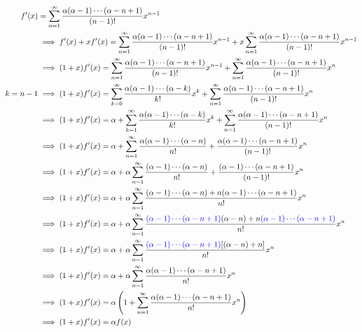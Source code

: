 \documentclass{article}
\begin{document}
\begin{align*}
  f'(x) &= \sum_{n=1}^\infty \frac{\alpha(\alpha
  -1)\cdots(\alpha-n+1)}{(n-1)!} x^{n-1}\\
  &\implies f'(x) + xf'(x) = \sum_{n=1}^\infty \frac{\alpha(\alpha
  -1)\cdots(\alpha-n+1)}{(n-1)!} x^{n-1} + x\sum_{n=1}^\infty \frac{\alpha(\alpha
    -1)\cdots(\alpha-n+1)}{(n-1)!} x^{n-1}\\
  &\implies (1+x)f'(x) = \sum_{n=1}^\infty \frac{\alpha(\alpha
  -1)\cdots(\alpha-n+1)}{(n-1)!} x^{n-1} + \sum_{n=1}^\infty \frac{\alpha(\alpha
    -1)\cdots(\alpha-n+1)}{(n-1)!} x^{n}\\
  k = n-1 &\implies (1+x)f'(x) = \sum_{k=0}^\infty \frac{\alpha(\alpha
            -1)\cdots(\alpha-k)}{k!} x^{k} + \sum_{n=1}^\infty \frac{\alpha(\alpha
            -1)\cdots(\alpha-n+1)}{(n-1)!} x^{n}\\
          &\implies (1+x)f'(x) = \alpha + \sum_{k=1}^\infty \frac{\alpha(\alpha
            -1)\cdots(\alpha-k)}{k!} x^{k} + \sum_{n=1}^\infty \frac{\alpha(\alpha
            -1)\cdots(\alpha-n+1)}{(n-1)!} x^{n}\\
  &\implies (1+x)f'(x) = \alpha + \sum_{n=1}^\infty \frac{\alpha(\alpha
            -1)\cdots(\alpha-n)}{n!} + \frac{\alpha(\alpha
    -1)\cdots(\alpha-n+1)}{(n-1)!} x^{n}\\
  &\implies (1+x)f'(x) = \alpha +\alpha \sum_{n=1}^\infty \frac{(\alpha
            -1)\cdots(\alpha-n)}{n!} + \frac{(\alpha
    -1)\cdots(\alpha-n+1)}{(n-1)!} x^{n}\\
  &\implies (1+x)f'(x) = \alpha +\alpha \sum_{n=1}^\infty \frac{(\alpha
            -1)\cdots(\alpha-n) + n(\alpha
    -1)\cdots(\alpha-n+1)}{n!} x^{n}\\
  &\implies (1+x)f'(x) = \alpha +\alpha \sum_{n=1}^\infty \frac{\color{blue}(\alpha
            -1)\cdots(\alpha -n+1)\color{black}(\alpha-n) + n\color{blue}(\alpha
    -1)\cdots(\alpha-n+1)\color{black}}{n!} x^{n}\\
  &\implies (1+x)f'(x) = \alpha +\alpha \sum_{n=1}^\infty \frac{\color{blue}(\alpha
    -1)\cdots(\alpha -n+1)\color{black}[(\alpha-n) + n]}{n!} x^{n}\\
  &\implies (1+x)f'(x) = \alpha +\alpha \sum_{n=1}^\infty \frac{\alpha(\alpha
    -1)\cdots(\alpha -n+1)}{n!} x^{n}\\
  &\implies (1+x)f'(x) = \alpha\left(1 + \sum_{n=1}^\infty \frac{\alpha(\alpha
    -1)\cdots(\alpha -n+1)}{n!} x^{n}\right)\\
  &\implies (1+x)f'(x) = \alpha f(x)\\
\end{align*}
\end{document}
